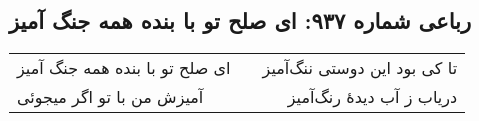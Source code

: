 \begin{center}
\section*{رباعی شماره ۹۳۷: ای صلح تو با بنده همه جنگ آمیز}
\label{sec:0937}
\begin{longtable}{l p{0.5cm} r}
ای صلح تو با بنده همه جنگ آمیز
&&
تا کی بود این دوستی ننگ‌آمیز
\\
آمیزش من با تو اگر میجوئی
&&
دریاب ز آب دیدهٔ رنگ‌آمیز
\\
\end{longtable}
\end{center}
